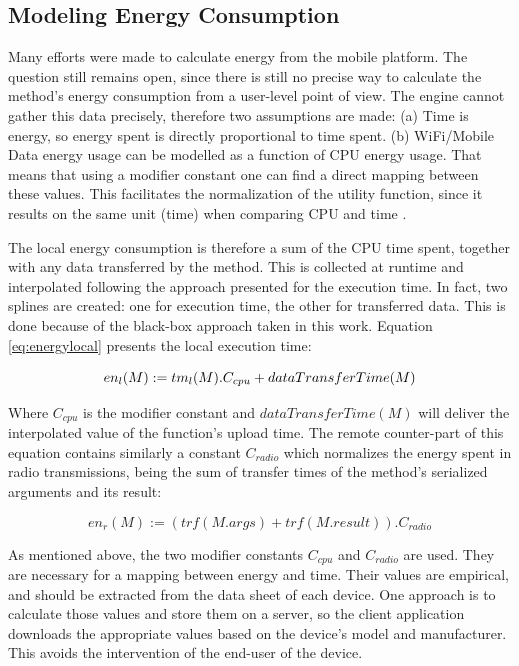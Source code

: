 \documentclass[10pt, conference, letterpaper]{IEEEtran}
\begin{document}
\subsection{Modeling Energy Consumption} 
\label{sec:energy}

  Many efforts were made to calculate energy from the mobile platform. The question still remains open, since there is still no precise way to calculate the method's energy consumption from a user-level point of view. The engine cannot gather this data precisely, therefore two assumptions are made: (a) Time is energy, so energy spent is directly proportional to time spent. (b) WiFi/Mobile Data energy usage can be modelled as a function of CPU energy usage. That means that using a modifier constant one can find a direct mapping between these values. This facilitates the normalization of the utility function, since it results on the same unit (time) when comparing CPU and time \cite{6606420}.

  The local energy consumption is therefore a sum of the CPU time spent, together with any data transferred by the method. This is  collected at runtime and interpolated following the approach presented for the execution time. In fact, two splines are created: one for execution time, the other for transferred data. This is done because of the black-box approach taken in this work. Equation \ref{eq:energylocal} presents the local execution time:

  \begin{equation} \label{eq:energylocal}
    en_{l}(M) := \\ tm_{l}(M) . C_{cpu} + dataTransferTime(M)
  \end{equation}

  Where $C_{cpu}$ is the modifier constant and $dataTransferTime(M)$ will deliver the interpolated value of the function's upload time. The remote counter-part of this equation contains similarly a constant $C_{radio}$ which normalizes the energy spent in radio transmissions, being the sum of transfer times of the method's serialized arguments and its result:

  \begin{equation} \label{eq:energyremote}
    en_{r}(M) := (trf(M.args) + trf(M.result)) . C_{radio}
  \end{equation}

  As mentioned above, the two modifier constants $C_{cpu}$ and $C_{radio}$ are used. They are necessary for a mapping between energy and time. Their values are empirical, and should be extracted from the data sheet of each device. One approach is to calculate those values and store them on a server, so the client application downloads the appropriate values based on the device's model and manufacturer. This avoids the intervention of the end-user of the device.
\end{document}
